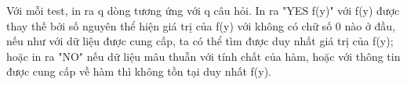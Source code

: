 Với mỗi test, in ra q dòng tương ứng với q câu hỏi. In ra "YES f(y)" với f(y) được thay thế bởi số nguyên thể hiện giá trị của f(y) với không có chữ số 0 nào ở đầu, nếu như với dữ liệu được cung cấp, ta có thể tìm được duy nhất giá trị của f(y); hoặc in ra "NO" nếu dữ liệu mâu thuẫn với tính chất của hàm, hoặc với thông tin được cung cấp về hàm thì không tồn tại duy nhất f(y).